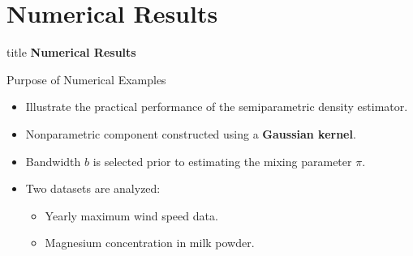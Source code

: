 \section{Numerical Results}
\begin{frame}{\hspace{3cm}}
\centering

\vspace{1.5cm}

\begin{beamercolorbox}[sep=20pt,center,rounded=true,shadow=true]{title}
    {\fontsize{20}{24}\selectfont \textbf{Numerical Results}}
\end{beamercolorbox}

\vspace{0.8cm}


\vfill

\end{frame}


\begin{frame}{Purpose of Numerical Examples}
\begin{itemize}
    \item Illustrate the practical performance of the semiparametric density estimator.
    \item Nonparametric component constructed using a \textbf{Gaussian kernel}.
    \item Bandwidth $b$ is selected prior to estimating the mixing parameter $\pi$.
    \item Two datasets are analyzed:
    \begin{itemize}
        \item Yearly maximum wind speed data.
        \item Magnesium concentration in milk powder.
    \end{itemize}
\end{itemize}
\end{frame}

